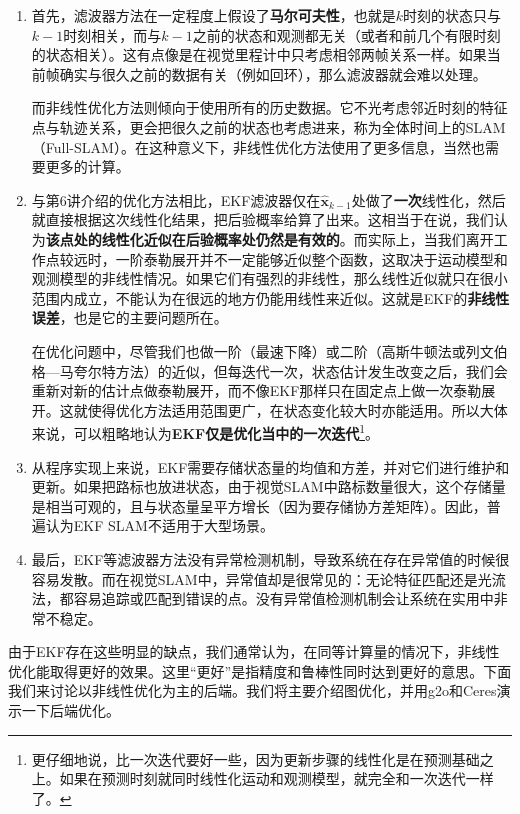 \begin{enumerate}
	\item 首先，滤波器方法在一定程度上假设了\textbf{马尔可夫性}，也就是$k$时刻的状态只与$k-1$时刻相关，而与$k-1$之前的状态和观测都无关（或者和前几个有限时刻的状态相关）。这有点像是在视觉里程计中只考虑相邻两帧关系一样。如果当前帧确实与很久之前的数据有关（例如回环），那么滤波器就会难以处理。

	而非线性优化方法则倾向于使用所有的历史数据。它不光考虑邻近时刻的特征点与轨迹关系，更会把很久之前的状态也考虑进来，称为全体时间上的SLAM（Full-SLAM）。在这种意义下，非线性优化方法使用了更多信息，当然也需要更多的计算。
	
	\item 与第6讲介绍的优化方法相比，EKF滤波器仅在$\bm{\hat{x}}_{k-1}$处做了\textbf{一次}线性化，然后就直接根据这次线性化结果，把后验概率给算了出来。这相当于在说，我们认为\textbf{该点处的线性化近似在后验概率处仍然是有效的}。而实际上，当我们离开工作点较远时，一阶泰勒展开并不一定能够近似整个函数，这取决于运动模型和观测模型的非线性情况。如果它们有强烈的非线性，那么线性近似就只在很小范围内成立，不能认为在很远的地方仍能用线性来近似。这就是EKF的\textbf{非线性误差}，也是它的主要问题所在。

	在优化问题中，尽管我们也做一阶（最速下降）或二阶（高斯牛顿法或列文伯格—马夸尔特方法）的近似，但每迭代一次，状态估计发生改变之后，我们会重新对新的估计点做泰勒展开，而不像EKF那样只在固定点上做一次泰勒展开。这就使得优化方法适用范围更广，在状态变化较大时亦能适用。所以大体来说，可以粗略地认为\textbf{EKF仅是优化当中的一次迭代}\footnote{更仔细地说，比一次迭代要好一些，因为更新步骤的线性化是在预测基础之上。如果在预测时刻就同时线性化运动和观测模型，就完全和一次迭代一样了。}。
	
	\item 从程序实现上来说，EKF需要存储状态量的均值和方差，并对它们进行维护和更新。如果把路标也放进状态，由于视觉SLAM中路标数量很大，这个存储量是相当可观的，且与状态量呈平方增长（因为要存储协方差矩阵）。因此，普遍认为EKF SLAM不适用于大型场景。
	
	\item 最后，EKF等滤波器方法没有异常检测机制，导致系统在存在异常值的时候很容易发散。而在视觉SLAM中，异常值却是很常见的：无论特征匹配还是光流法，都容易追踪或匹配到错误的点。没有异常值检测机制会让系统在实用中非常不稳定。
\end{enumerate}

由于EKF存在这些明显的缺点，我们通常认为，在同等计算量的情况下，非线性优化能取得更好的效果\textsuperscript{\cite{Strasdat2012}}。这里“更好”是指精度和鲁棒性同时达到更好的意思。下面我们来讨论以非线性优化为主的后端。我们将主要介绍图优化，并用g2o和Ceres演示一下后端优化。

